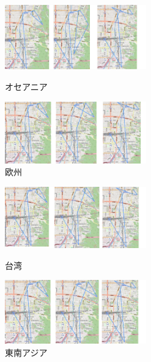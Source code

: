 \documentclass[a4paper,12pt]{jsreport}
\theoremstyle{definition}
\begin{document}
\begin{figure}[htbp]
    \begin{minipage}{0.49\hsize}
        \begin{center}
            \includegraphics[width=61mm]{png/oseania.png}
        \end{center}
        \caption{オセアニア}
        \label{fig:oseania}
    \end{minipage}
    \begin{minipage}{0.49\hsize}
        \begin{center}
            \includegraphics[width=61mm]{png/oushuu.png}
        \end{center}
        \caption{欧州}
        \label{fig:oushuu}
    \end{minipage}
\end{figure}
\newpage
\begin{figure}[htbp]
    \begin{minipage}{0.49\hsize}
        \begin{center}
            \includegraphics[width=61mm]{png/taiwan.png}
        \end{center}
        \caption{台湾}
        \label{fig:taiwan}
    \end{minipage}
    \begin{minipage}{0.49\hsize}
        \begin{center}
            \includegraphics[width=61mm]{png/tounanazia.png}
        \end{center}
        \caption{東南アジア}
        \label{fig:tounanazia}
    \end{minipage}
\end{figure}
\end{document}
